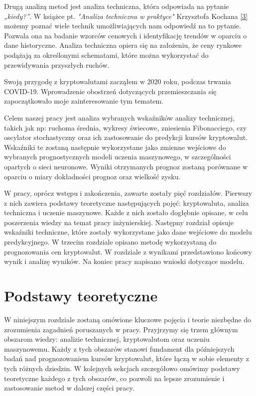 \documentclass[12pt,a4paper,twoside, inzynierska]{pwr_wmat_praca_dyplomowa}
\theoremstyle{plain}
\numberwithin{theorem}{chapter}
\theoremstyle{definition}
\numberwithin{theorem}{chapter}
\begin{document}
	Drugą analizą metod jest analiza techniczna, która odpowiada na pytanie \emph{„kiedy?”}. W książce pt. \emph{"Analiza techniczna w praktyce"} Krzysztofa Kochana \hyperref[info3]{[3]} możemy poznać wiele technik umożliwiających nam odpowiedź na to pytanie. Pozwala ona na badanie wzorców cenowych i identyfikację trendów w oparciu o dane historyczne. Analiza techniczna opiera się na założeniu, że ceny rynkowe podążają za określonymi schematami, które można wykorzystać do przewidywania przyszłych ruchów.
	
	Swoją przygodę z kryptowalutami zacząłem w 2020 roku, podczas trwania COVID-19. Wprowadzenie obostrzeń dotyczących przemieszczania się zapoczątkowało moje zainteresowanie tym tematem.
	
	Celem naszej pracy jest analiza wybranych wskaźników analizy technicznej, takich jak np: ruchoma średnia, wykresy świecowe, zniesienia Fibonacciego, czy oscylator stochastyczny oraz ich zastosowanie do predykcji kursów kryptowalut. Wskaźniki te zostaną następnie wykorzystane jako zmienne wejściowe do wybranych prognostycznych modeli uczenia maszynowego, w szczególności opartych o sieci neuronowe. Wyniki otrzymanych prognoz zostaną porównane w oparciu o miary dokładności prognoz oraz wielkość zysku.
	
	W pracy, oprócz wstępu i zakończenia, zawarte zostały pięć rozdziałów. Pierwszy z nich zawiera podstawy teoretyczne następujących pojęć: kryptowaluta, analiza techniczna i uczenie maszynowe. Każde z nich zostało dogłębnie opisane, w celu poszerzenia wiedzy na temat pracy inżynierskiej. Następny rozdział opisuje wskaźniki techniczne, które zostały wykorzystane jako dane wejściowe do modelu predykcyjnego. W trzecim rozdziale opisano metodę wykorzystaną do prognozowania cen kryptowalut. W rozdziale z wynikami przedstawiono końcowy wynik i analizę wyników. Na koniec pracy napisano wnioski dotyczące modelu.
	\chapter{Podstawy teoretyczne}
	
	W niniejszym rozdziale zostaną omówione kluczowe pojęcia i teorie niezbędne do zrozumienia zagadnień poruszanych w pracy. Przyjrzymy się trzem głównym obszarom wiedzy: analizie technicznej, kryptowalutom oraz uczeniu maszynowemu. Każdy z tych obszarów stanowi fundament dla późniejszych badań nad prognozowaniem kursów kryptowalut, które łączą w sobie elementy z tych różnych dziedzin. W kolejnych sekcjach szczegółowo omówimy podstawy teoretyczne każdego z tych obszarów, co pozwoli na lepsze zrozumienie i zastosowanie metod w dalszej części pracy.
\end{document}
